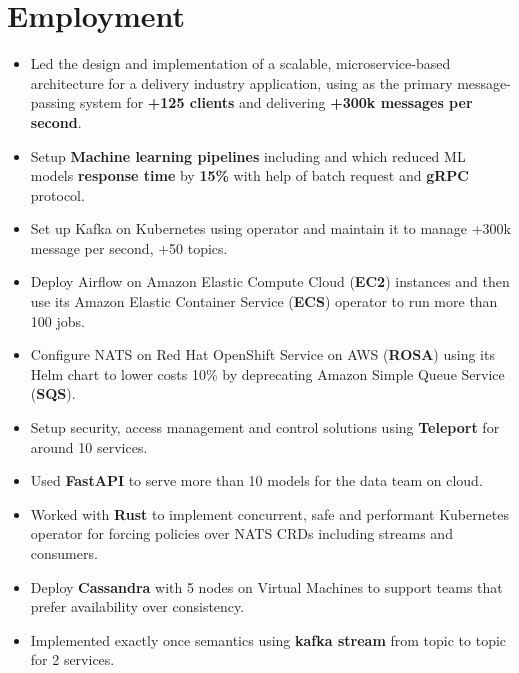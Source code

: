 \section{Employment}

\begin{itemize}
      \item Led the design and implementation of a scalable, microservice-based architecture for a delivery industry application,
            using  as the primary message-passing system for \textbf{+125 clients} and delivering
            \textbf{+300k messages per second}.
      \item Setup \textbf{Machine learning pipelines} including  and
             which reduced ML models \textbf{response time} by \textbf{15\%}
            with help of batch request and \textbf{gRPC} protocol.
      \item Set up Kafka on Kubernetes using  operator and maintain it to manage +300k
            message per second, +50 topics.
      \item Deploy Airflow on Amazon Elastic Compute Cloud (\textbf{EC2}) instances and then use
            its Amazon Elastic Container Service (\textbf{ECS}) operator
            to run more than 100 jobs.
      \item Configure NATS on Red Hat OpenShift Service on AWS (\textbf{ROSA})
            using its Helm chart to lower costs 10\% by deprecating Amazon Simple Queue Service (\textbf{SQS}).
      \item Setup security, access management and control solutions using \textbf{Teleport} for around 10 services.
      \item Used \textbf{FastAPI} to serve more than 10 models for the data team on cloud.
      \item Worked with \textbf{Rust} to implement concurrent, safe and performant Kubernetes operator for forcing
            policies over NATS CRDs including streams and consumers.
      \item Deploy \textbf{Cassandra} with 5 nodes on Virtual Machines to support teams that prefer availability over consistency.
      \item Implemented exactly once semantics using \textbf{kafka stream} from topic to topic for 2 services.
\end{itemize}


